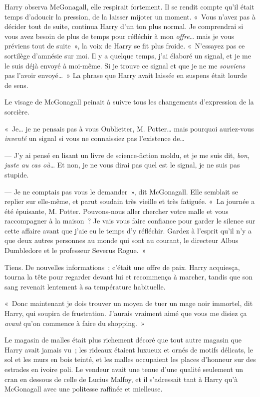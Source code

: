 Harry observa McGonagall, elle respirait fortement.
Il se rendit compte qu'il était temps d'adoucir la pression, de la laisser mijoter un moment.
«~Vous n'avez pas à décider tout de suite, continua Harry d'un ton plus normal.
Je comprendrai si vous avez besoin de plus de temps pour réfléchir à mon \emph{offre}… mais je vous préviens tout de suite~», la voix de Harry se fit plus froide.
«~N'essayez pas ce sortilège d'amnésie sur moi.
Il y a quelque temps, j'ai élaboré un signal, et je me le suis déjà envoyé à moi-même.
Si je trouve ce signal et que je ne me \emph{souviens} pas l'avoir envoyé…~»
La phrase que Harry avait laissée en suspens était lourde de sens.

Le visage de McGonagall peinait à suivre tous les changements d'expression de la sorcière.

«~Je… je ne pensais pas à vous Oublietter, M. Potter… mais pourquoi auriez-vous \emph{inventé} un signal si vous ne connaissiez pas l'existence de…

--- J'y ai pensé en lisant un livre de science-fiction moldu, et je me suis dit, \emph{bon, juste au cas où}… Et non, je ne vous dirai pas quel est le signal, je ne suis pas stupide.

--- Je ne comptais pas vous le demander~», dit McGonagall. Elle semblait se replier sur elle-même, et parut soudain très vieille et très fatiguée.
«~La journée a été épuisante, M. Potter. Pouvons-nous aller chercher votre malle et vous raccompagner à la maison~?
Je vais vous faire confiance pour garder le silence sur cette affaire avant que j'aie eu le temps d'y réfléchir.
Gardez à l'esprit qu'il n'y a que deux autres personnes au monde qui sont au courant, le directeur Albus Dumbledore et le professeur Severus Rogue.~»

Tiens. De nouvelles informations~; c'était une offre de paix. Harry acquiesça, tourna la tête pour regarder devant lui et recommença à marcher, tandis que son sang revenait lentement à sa température habituelle.

«~Donc maintenant je dois trouver un moyen de tuer un mage noir immortel, dit Harry, qui soupira de frustration. J'aurais vraiment aimé que vous me disiez ça \emph{avant} qu'on commence à faire du shopping.~»

\later

Le magasin de malles était plus richement décoré que tout autre magasin que Harry avait jamais vu~;
les rideaux étaient luxueux et ornés de motifs délicats, le sol et les murs en bois teinté, et les malles occupaient les places d'honneur sur des estrades en ivoire poli.
Le vendeur avait une tenue d'une qualité seulement un cran en dessous de celle de Lucius Malfoy, et il s'adressait tant à Harry qu'à McGonagall avec une politesse raffinée et mielleuse.

